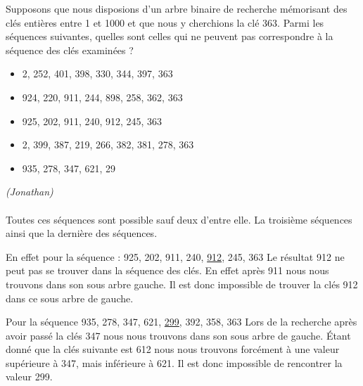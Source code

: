 
Supposons que nous disposions d'un arbre binaire de recherche mémorisant des clés entières entre 1 et 1000 et que nous y cherchions la clé 363. Parmi les séquences suivantes, quelles sont celles qui ne peuvent pas correspondre à la séquence des clés examinées ?

\begin{itemize}

\item 2, 252, 401, 398, 330, 344, 397, 363
\item 924, 220, 911, 244, 898, 258, 362, 363
\item 925, 202, 911, 240, 912, 245, 363
\item 2, 399, 387, 219, 266, 382, 381, 278, 363
\item 935, 278, 347, 621, 29

\end{itemize}
\textit{(Jonathan)} \\
\\ Toutes ces séquences sont possible sauf deux d'entre elle.
La troisième séquences ainsi que la dernière des séquences.

En effet pour la séquence : 925, 202, 911, 240, \underline{912}, 245, 363
Le résultat 912 ne peut pas se trouver dans la séquence des clés. En effet après 911 nous nous trouvons dans son sous arbre gauche. Il est donc impossible de trouver la clés 912 dans ce sous arbre de gauche.


Pour la séquence 935, 278, 347, 621, \underline{299}, 392, 358, 363
Lors de la recherche après avoir passé la clés 347 nous nous trouvons dans son sous arbre de gauche. Étant donné que la clés suivante est 612 nous nous trouvons forcément à une valeur supérieure à 347, mais inférieure à 621. Il est donc impossible de rencontrer la valeur 299.